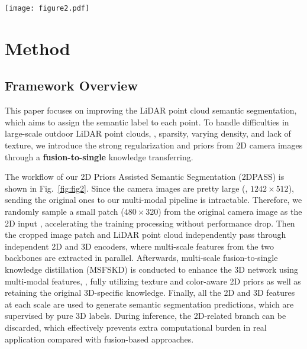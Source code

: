 \documentclass[runningheads]{llncs}
\begin{document}
	
	
		\begin{figure*}[t]
		\begin{centering}
			\texttt{[image: figure2.pdf]}
			\caption{\textbf{{2D Priors Assisted Semantic Segmentation} ({2DPASS}).} It first crops a small patch from the original camera image as the 2D input.
Then the cropped image patch and LiDAR point cloud independently pass through the 2D and 3D encoders to generate multi-scale features in parallel.
Afterwards, for each scale, complementary 2D knowledge is effectively transferred to the 3D network via the multi-scale fusion-to-single knowledge distillation (MSFSKD).
The feature maps (in the form of either pixel grid or point set) are used to generate the final semantic scores using modal-specific decoders, which are supervised by pure 3D labels.
}
			\label{fig:fig2}
		\end{centering}	
	\end{figure*}
	
	
	\section{Method}
	\subsection{Framework Overview}
This paper focuses on improving the LiDAR point cloud semantic segmentation, which aims to assign the semantic label to each point.
To handle difficulties in large-scale outdoor LiDAR point clouds, \ie, sparsity, varying density, and lack of texture, we introduce the strong regularization and priors from 2D camera images through a \textbf{fusion-to-single} knowledge transferring.
	
	
	The workflow of our {2D Priors Assisted Semantic Segmentation} ({2DPASS}) is shown in Fig.~\ref{fig:fig2}.
Since the camera images are pretty large (\eg, $1242 \times 512$), sending the original ones to our multi-modal pipeline is intractable.
Therefore, we randomly sample a small patch ($480 \times 320$) from the original camera image as the 2D input \cite{jaritz2020xmuda}, accelerating the training processing without performance drop.
Then the cropped image patch and LiDAR point cloud independently pass through independent 2D and 3D encoders, where multi-scale features from the two backbones are extracted in parallel.
Afterwards, multi-scale fusion-to-single knowledge distillation (MSFSKD) is conducted to enhance the 3D network using multi-modal features, \ie, fully utilizing texture and color-aware 2D priors as well as retaining the original 3D-specific knowledge.
Finally, all the 2D and 3D features at each scale are used to generate semantic segmentation predictions, which are supervised by pure 3D labels.
During inference, the 2D-related branch can be discarded, which effectively prevents extra computational burden in real application compared with fusion-based approaches.
	
\end{document}
